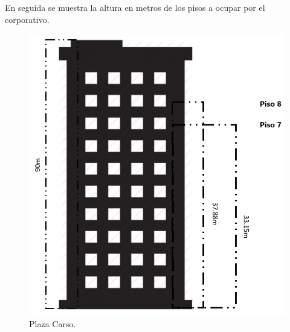 \documentclass[12pt,letterpaper]{article}
\begin{document}
\newpage
En seguida se muestra la altura en metros de los pisos a ocupar por el corporativo.
\begin{figure}[ht]
    \centering
    \includegraphics[width=.8\textwidth]{imagenes/torre.png}
    \caption{Plaza Carso.}
\end{figure}

\newpage
\end{document}
